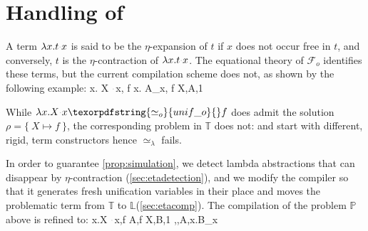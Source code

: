 \documentclass[sigconf,natbib=false,review]{acmart}
\newcommand{\appsep}{\ensuremath{\textcolor{lightgray}{\cdot}}}
\newcommand{\UnifRel}{\ensuremath{\simeq}}
\newcommand{\Uo}{\texorpdfstring{\ensuremath{\UnifRel_o}\xspace}{unif\_o}}
\newcommand{\Ue}{\ensuremath{\UnifRel_\lambda}\xspace}
\newcommand{\Fo}{\texorpdfstring{\ensuremath{\mathcal{F}_{\!o}\xspace}}{Fo}} %
\newcommand{\linkStore}{\texorpdfstring{\ensuremath{\mathbb{L}}\xspace}{L}}
\newcommand{\foUnifPb}{\ensuremath{\mathbb{P}}\xspace}
\newcommand{\hoUnifPb}{\ensuremath{\mathbb{T}}\xspace}
\begin{document}







\section{Handling of \maybeeta}\label{sec:eta}
A term 
$\lambda x. t \appsep x$ is said to be the $\eta$-expansion of $t$ if
$x$ does not occur free in $t$, and conversely, $t$ is the $\eta$-contraction of
$\lambda x. t \appsep x$. The equational theory of \Fo{} identifies these terms,
but the current compilation scheme does not,
as shown by the following example:
%
\printAlll
  {{{\lambda x. X \appsep x, f}}}
  {{{\lambda x. A_x, f}}}
  {{{X,A,1}}}
  {{}}

\noindent
While $\lambda x.X \appsep x \Uo{} f$ does admit the solution
$\rho = \{~ X \mapsto f ~\}$, the corresponding problem in
\hoUnifPb does not:
 and
 start with different, rigid, term constructors hence
\Ue{} fails.

In order to guarantee \cref{prop:simulation}, we detect
lambda abstractions that can disappear by $\eta$-contraction
(\cref{sec:etadetection}), and we modify the compiler so that it
generates fresh unification variables
in their place and moves the problematic term 
from \hoUnifPb to \linkStore (\cref{sec:etacomp}). The compilation
of the problem \foUnifPb above is refined to: 
%
\printAlll
  {{{\lambda x.X \appsep x,f}}}
  {{{A,f}}}
  {{{X,B,1}}}
  {{{\eta,,A,\lambda x.B_x}}}
\end{document}

